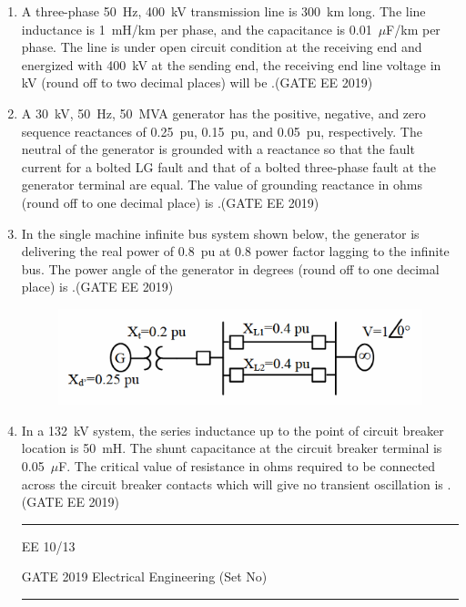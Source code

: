 \documentclass[a4paper,10pt]{exam}
\theoremstyle{remark}
\begin{document}
\begin{enumerate}
\begin{enumerate}[label=\arabic*.]
  \item A three-phase 50~Hz, 400~kV transmission line is 300~km long. The line inductance is 1~mH/km per phase, and the capacitance is 0.01~$\mu$F/km per phase. The line is under open circuit condition at the receiving end and energized with 400~kV at the sending end, the receiving end line voltage in kV (round off to two decimal places) will be \underline{\hspace{2cm}}.\hfill{(GATE EE 2019)}

  \item A 30~kV, 50~Hz, 50~MVA generator has the positive, negative, and zero sequence reactances of 0.25~pu, 0.15~pu, and 0.05~pu, respectively. The neutral of the generator is grounded with a reactance so that the fault current for a bolted LG fault and that of a bolted three-phase fault at the generator terminal are equal. The value of grounding reactance in ohms (round off to one decimal place) is \underline{\hspace{2cm}}.\hfill{(GATE EE 2019)}

  \item In the single machine infinite bus system shown below, the generator is delivering the real power of 0.8~pu at 0.8 power factor lagging to the infinite bus. The power angle of the generator in degrees (round off to one decimal place) is \underline{\hspace{2cm}}.\hfill{(GATE EE 2019)}

\begin{figure}[H]
    \centering
    \includegraphics[width=0.7\columnwidth]{figs/Q 51.png}\caption{}     \label{fig:placeholder}
\end{figure}

  \item In a 132~kV system, the series inductance up to the point of circuit breaker location is 50~mH. The shunt capacitance at the circuit breaker terminal is 0.05~$\mu$F. The critical value of resistance in ohms required to be connected across the circuit breaker contacts which will give no transient oscillation is \underline{\hspace{2cm}}.\hfill{(GATE EE 2019)}
\vfill
\noindent\rule{\linewidth}{0.4pt}
EE \hfill 10/13
\newpage
\raggedright{GATE 2019 Electrical Engineering (Set No)}
\noindent\rule{\linewidth}{0.4pt}


\end{enumerate}
\end{enumerate}
\end{document}
